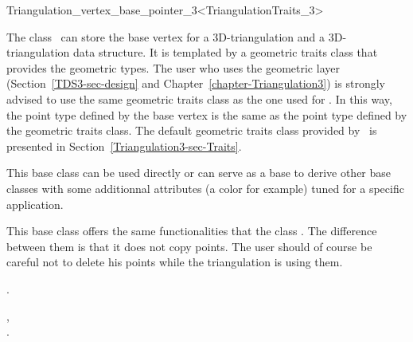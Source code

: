

\begin{ccRefClass}{Triangulation_vertex_base_pointer_3<TriangulationTraits_3>}  %


\ccDefinition
  
The class \ccRefName\ can store the base vertex for a 3D-triangulation 
and a 3D-triangulation data structure. It is templated by a
geometric traits class  that provides the geometric
types. The user who uses the geometric layer
(Section~\ref{TDS3-sec-design} and
Chapter~\ref{chapter-Triangulation3}) is strongly advised to use the
same geometric traits class  as the one used for
. 
In this way, the point type
defined by the base vertex is the same as the point type defined by
the geometric traits class. The default geometric traits class
provided by \cgal\ is presented in
Section~\ref{Triangulation3-sec-Traits}. 

This base class can be used directly or can serve as a base to derive
other base classes with some additionnal attributes (a color for
example) tuned for a specific application.

This base class offers the same functionalities that the class
. The difference between them is that 
it does not copy points. The user should of course be careful not to
delete his points while the triangulation is using them. 


\ccIsModel

.

\ccSeeAlso

,\\
.



\end{ccRefClass}


